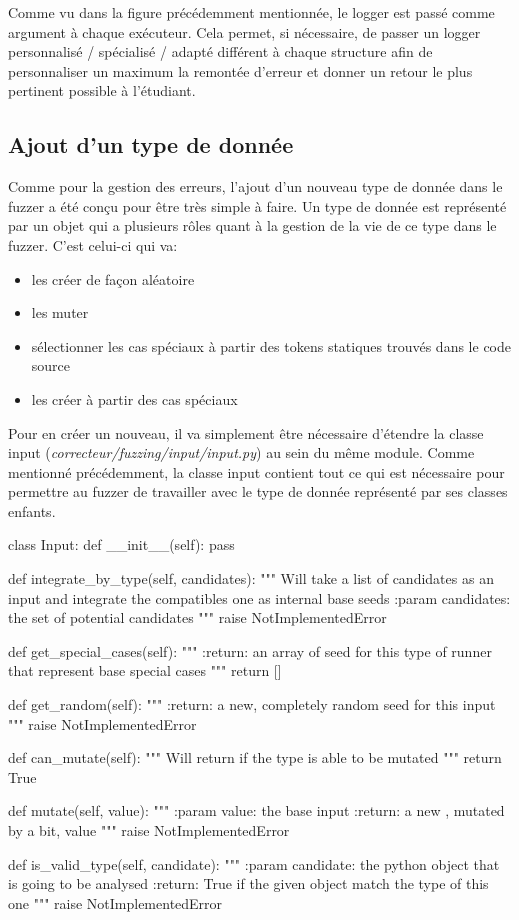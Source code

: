 \documentclass[a4paper]{report}
\begin{document}
Comme vu dans la figure précédemment mentionnée, le logger est passé comme argument à chaque exécuteur.
Cela permet, si nécessaire, de passer un logger personnalisé / spécialisé / adapté différent à chaque structure afin de personnaliser un maximum la remontée d'erreur et donner un retour le plus pertinent possible à l'étudiant.

\subsection{Ajout d'un type de donnée}

Comme pour la gestion des erreurs, l'ajout d'un nouveau type de donnée dans le fuzzer a été conçu pour être très simple à faire.
Un type de donnée est représenté par un objet qui a plusieurs rôles quant à la gestion de la vie de ce type dans le fuzzer.
C'est celui-ci qui va:
\begin{itemize}
\item les créer de façon aléatoire
\item les muter
\item sélectionner les cas spéciaux à partir des tokens statiques trouvés dans le code source
\item les créer à partir des cas spéciaux
\end{itemize}

Pour en créer un nouveau, il va simplement être nécessaire d'étendre la classe input (\textit{correcteur/fuzzing/input/input.py}) au sein du même module.
Comme mentionné précédemment, la classe input contient tout ce qui est nécessaire pour permettre au fuzzer de travailler avec le type de donnée représenté par ses classes enfants.
\begin{python}
class Input:
    def __init__(self):
        pass

    def integrate_by_type(self, candidates):
        """
        Will take a list of candidates as an input
        and integrate the compatibles one as internal
        base seeds
        :param candidates: the set of potential candidates
        """
        raise NotImplementedError

    def get_special_cases(self):
        """
        :return: an array of seed for this type of
        	runner that represent base special cases
        """
        return []

    def get_random(self):
        """
        :return: a new, completely random seed for
        	this input
        """
        raise NotImplementedError

    def can_mutate(self):
        """
        Will return if the type is able to be mutated
        """
        return True

    def mutate(self, value):
        """
        :param value: the base input
        :return: a new , mutated by a bit, value
        """
        raise NotImplementedError

    def is_valid_type(self, candidate):
        """
        :param candidate: the python object that is
        	going to be analysed
        :return: True if the given object match the
        	type of this one
        """
        raise NotImplementedError
\end{python}
\end{document}
